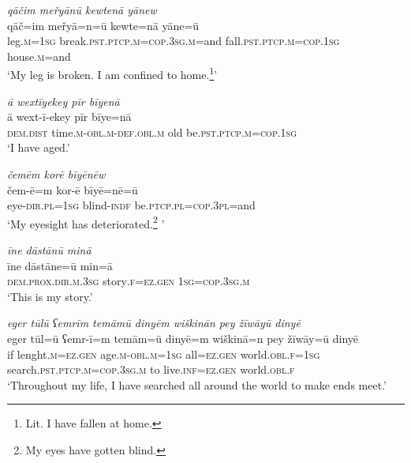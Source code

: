 \ea \label{ŽM.9}
\textit{qāčim meřyānū kewtenā yānew} \\ 
\gll qāč=im meřyā=n=ū kewte=nā yāne=ū \\ 
 leg\textsc{.m}\textsc{=\textsc{1sg}} break\textsc{.pst}\textsc{.ptcp}\textsc{.m}\textsc{=cop}\textsc{.3sg}\textsc{.m}=and fall\textsc{.pst}\textsc{.ptcp}\textsc{.m}\textsc{=cop}\textsc{.\textsc{1sg}} house\textsc{.m}=and \\ 
\glt `My leg is broken. I am confined to home.\footnote{Lit. I have fallen at home.}'
\z 
 
\ea \label{ŽM.10}
\textit{ā wextīyekey pīr bīyenā} \\ 
\gll ā wext-ī-ekey pīr bīye=nā \\ 
 \textsc{dem.dist} time\textsc{.m}\textsc{-obl}\textsc{.m}\textsc{-def}\textsc{.obl}\textsc{.m} old be\textsc{.pst}\textsc{.ptcp}\textsc{.m}\textsc{=cop}\textsc{.\textsc{1sg}} \\ 
\glt `I have aged.'
\z 
 
\ea \label{ŽM.11}
\textit{čemēm korē bīyēnēw} \\ 
\gll čem-ē=m kor-ē bīyē=nē=ū \\ 
 eye\textsc{-dir}\textsc{.pl}\textsc{=\textsc{1sg}} blind\textsc{-indf} be\textsc{.ptcp}\textsc{.pl}\textsc{=cop}\textsc{.3pl}=and \\ 
\glt `My eyesight has deteriorated.\footnote{My eyes have gotten blind.} '
\z 
 
\ea \label{ŽM.12}
\textit{īne dāstānū minā} \\ 
\gll īne dāstāne=ū min=ā \\ 
 \textsc{dem.prox}\textsc{.dir}\textsc{.m}\textsc{.3sg} story\textsc{.f}\textsc{=ez.gen} \textsc{1sg}\textsc{=cop}\textsc{.3sg}\textsc{.m} \\ 
\glt `This is my story.'
\z 
 
\ea \label{ŽM.13}
\textit{eger tūlū ʕemrīm temāmū dinyēm wiškinān pey žīwāyū dinyē} \\ 
\gll eger tūl=ū ʕemr-ī=m temām=ū dinyē=m wiškinā=n pey žīwāy=ū dinyē \\ 
 if lenght\textsc{.m}\textsc{=ez.gen} age\textsc{.m}\textsc{-obl}\textsc{.m}\textsc{=\textsc{1sg}} all\textsc{=ez.gen} world\textsc{.obl}\textsc{.f}\textsc{=\textsc{1sg}} search\textsc{.pst}\textsc{.ptcp}\textsc{.m}\textsc{=cop}\textsc{.3sg}\textsc{.m} to live\textsc{.inf}\textsc{=ez.gen} world\textsc{.obl}\textsc{.f} \\ 
\glt `Throughout my life, I have searched all around the world to make ends meet.'
\z 
 
